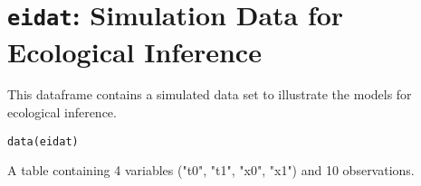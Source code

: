  \section{{\tt eidat}: Simulation Data for Ecological Inference}\label{ss:eidat}
\begin{Description}\relax
This dataframe contains a simulated data set to illustrate the models
for ecological inference.
\end{Description}
\begin{Usage}
\begin{verbatim}data(eidat)\end{verbatim}
\end{Usage}
\begin{Format}\relax
A table containing 4 variables ("t0", "t1", "x0", "x1") and 10 
observations.
\end{Format}


